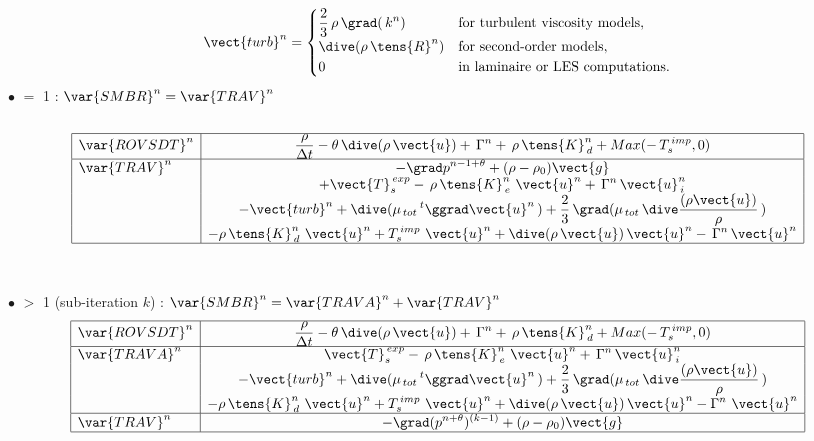 \begin{equation}\notag
\vect{turb}^{n}=
\begin{cases}
\displaystyle\frac {2}{3}\,\rho\,\grad (\,k^{n}) &
\text{for turbulent viscosity models}, \\
\dive(\rho\,\tens{R}^n) & \text{for second-order models},\\
0 & \text{in laminaire or LES computations.}\\
\end{cases}
\end{equation}
$\bullet$  $=$ 1 : $\var{SMBR}^n=\var{TRAV}^n$
\\\\
\begin{equation}\label{Base_Predvv_tab_exp0}
\begin{array}{|l|c|}
\hline
\var{ROVSDT}^{n} &
\displaystyle \frac{\rho}{\Delta t} -\theta \,\dive (\rho\,\vect {u}) +\, \Gamma^n + \, \rho\,\tens{K}_{\,d}^n+Max(-\,T_s^{\,imp},0)\\
\hline
\var{TRAV}^{n}
& \displaystyle
- \grad p^{n-1+\theta} + (\rho -\rho_0) \vect {g} \\
& \displaystyle
+ \vect{T}_{s}^{\,exp}-\,\rho\,\tens{K}_{\,e}^{n}\ \vect{u}^{n} + \,\Gamma^{n}\,\vect{u}_{\,i}^{n}\\
& \displaystyle
-\vect{turb}^{n}+ \dive (\mu_{\,tot}\,^t\ggrad \vect {u}^{n}\,)+ \frac {2} {3}\,\grad (\mu_{\,tot}\,\dive \frac{(\rho \vect {u})}{\rho}\,)\\
& \displaystyle
-\rho\,\tens{K}_{\,d}^n\ \vect{u}^{n}+ T_s^{\,imp}\,\,\vect {u}^{n} + \dive (\rho\,\vect {u})\,\vect{u}^{n} - \,\Gamma^{n}\,\vect{u}^{n}\\
\hline
\end{array}
\end{equation}
\\\\
$\bullet$  $>$ 1 (sub-iteration $k$) : $\var{SMBR}^n=\var{TRAVA}^n+\var{TRAV}^n$
\begin{equation}\label{Base_Predvv_tab_exp1}
\begin{array}{|l|c|}
\hline
\var{ROVSDT}^{n} &
\displaystyle \frac{\rho}{\Delta t} -\theta \,\dive (\rho\,\vect {u}) +\, \Gamma^n + \, \rho\,\tens{K}_{\,d}^n+Max(-\,T_s^{\,imp},0)\\
\hline
\var{TRAVA}^{n} &
\displaystyle
\vect{T}_{s}^{\,exp}-\,\rho\,\tens{K}_{\,e}^{n}\ \vect{u}^{n} + \,\Gamma^{n}\,\vect{u}_{\,i}^{n}\\
& \displaystyle
-\vect{turb}^{n}+ \dive (\mu_{\,tot}\,^t\ggrad \vect {u}^{n}\,)+ \frac {2} {3}\,\grad (\mu_{\,tot}\,\dive \frac{(\rho \vect {u})}{\rho}\,)\\
& \displaystyle
-\rho\,\tens{K}_{\,d}^n\ \vect{u}^{n}+ T_s^{\,imp}\,\,\vect {u}^{n} + \dive (\rho\,\vect {u})\,\vect{u}^{n} - \Gamma^n\,\,\vect{u}^{n}\\
\hline
\var{TRAV}^{n} &
\displaystyle
- \grad (p^{n+\theta})^{(k-1)} + (\rho -\rho_0) \vect {g} \\
\hline
\end{array}
\end{equation}

